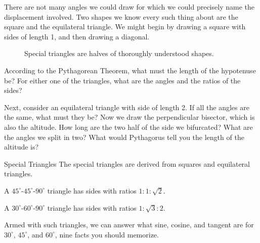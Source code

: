 



There are not many angles we could draw for which we could precisely name
the displacement involved.  Two shapes we know every such thing about are the 
square and the equilateral triangle.  We might begin by drawing a square with
sides of length 1, and then drawing a diagonal.

\begin{figure}[h]
\begin{center}
\caption{Special triangles are halves of thoroughly understood shapes.}
\end{center}
\end{figure}

According to the Pythagorean Theorem, what must the length of the 
hypotenuse be?  For either one of the triangles, what are the angles and
the ratios of the sides?

Next, consider an equilateral triangle with side of length 2.  If all the angles
are the same, what must they be?  Now we draw the perpendicular bisector,
which is also the altitude.  How long are the two half of the side we 
bifurcated?  What are the angles we split in two?  What would Pythagorus
tell you the length of the altitude is?

\begin{derivation}{Special Triangles}
The special triangles are derived from
squares and equilateral triangles.

A $45^\circ$-$45^\circ$-$90^\circ$ triangle has sides with ratios $1:1:\sqrt{2}$.

A $30^\circ$-$60^\circ$-$90^\circ$ triangle has sides with ratios $1:\sqrt{3}:2$.
\end{derivation}

Armed with such triangles, we can answer what sine, cosine, and tangent are
for $30^\circ$, $45^\circ$, and $60^\circ$, nine facts you should memorize.

